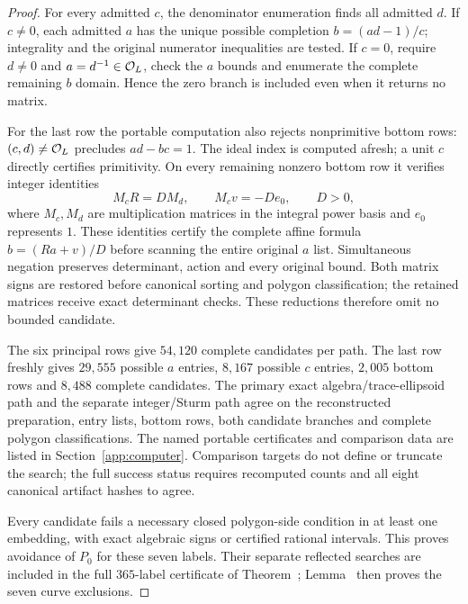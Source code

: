 \begin{proof}
For every admitted $c$, the denominator enumeration finds all admitted
$d$. If $c\ne0$, each admitted $a$ has the unique possible completion
$b=(ad-1)/c$; integrality and the original numerator inequalities are
tested. If $c=0$, require $d\ne0$ and $a=d^{-1}\in\mathcal O_L$, check the
$a$ bounds and enumerate the complete remaining $b$ domain. Hence the
zero branch is included even when it returns no matrix.

For the last row the portable computation also rejects nonprimitive
bottom rows: $(c,d)\ne\mathcal O_L$ precludes $ad-bc=1$. The ideal index is
computed afresh; a unit $c$ directly certifies primitivity. On every
remaining nonzero bottom row it verifies integer identities
\[
 M_cR=D M_d,\qquad M_c v=-D e_0,\qquad D>0,
\]
where $M_c,M_d$ are multiplication matrices in the integral power basis
and $e_0$ represents $1$. These identities certify the complete affine
formula $b=(Ra+v)/D$ before scanning the entire original $a$ list.
Simultaneous negation preserves determinant, action and every original
bound. Both matrix signs are restored before canonical sorting and
polygon classification; the retained matrices receive exact determinant
checks. These reductions therefore omit no bounded candidate.

The six principal rows give $54{,}120$ complete candidates per path.
The last row freshly gives $29{,}555$ possible $a$ entries, $8{,}167$
possible $c$ entries, $2{,}005$ bottom rows and $8{,}488$ complete
candidates. The primary exact algebra/trace-ellipsoid path and the
separate integer/Sturm path agree on the reconstructed preparation,
entry lists, bottom rows, both candidate branches and complete polygon
classifications. The named portable certificates and comparison data
are listed in Section~\ref{app:computer}. Comparison targets do not
define or truncate the search; the full success status requires
recomputed counts and all eight canonical artifact hashes to agree.

Every candidate fails a necessary closed polygon-side condition in at
least one embedding, with exact algebraic signs or certified rational
intervals. This proves avoidance of $P_0$ for these seven labels.
Their separate reflected searches are included in the full $365$-label
certificate of Theorem~;
Lemma~ then proves the seven curve exclusions.
\end{proof}

